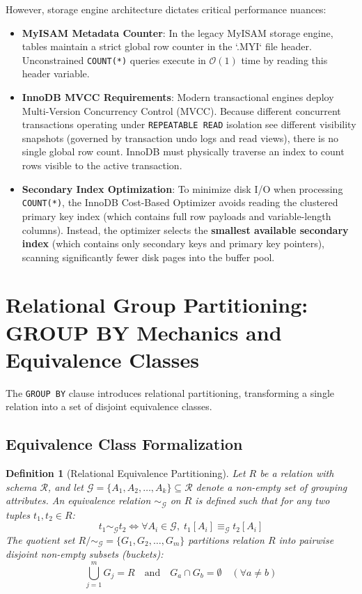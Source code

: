 \documentclass[10pt,twocolumn,letterpaper]{article}
\newtheorem{definition}[theorem]{Definition}
\begin{document}
However, storage engine architecture dictates critical performance nuances:
\begin{itemize}
    \item \textbf{MyISAM Metadata Counter}: In the legacy MyISAM storage engine, tables maintain a strict global row counter in the `.MYI` file header. Unconstrained \texttt{COUNT(*)} queries execute in $\mathcal{O}(1)$ time by reading this header variable.
    \item \textbf{InnoDB MVCC Requirements}: Modern transactional engines deploy Multi-Version Concurrency Control (MVCC). Because different concurrent transactions operating under \texttt{REPEATABLE READ} isolation see different visibility snapshots (governed by transaction undo logs and read views), there is no single global row count. InnoDB must physically traverse an index to count rows visible to the active transaction.
    \item \textbf{Secondary Index Optimization}: To minimize disk I/O when processing \texttt{COUNT(*)}, the InnoDB Cost-Based Optimizer avoids reading the clustered primary key index (which contains full row payloads and variable-length columns). Instead, the optimizer selects the \textbf{smallest available secondary index} (which contains only secondary keys and primary key pointers), scanning significantly fewer disk pages into the buffer pool.
\end{itemize}

\section{Relational Group Partitioning: GROUP BY Mechanics and Equivalence Classes}
\label{sec:group_by}

The \texttt{GROUP BY} clause introduces relational partitioning, transforming a single relation into a set of disjoint equivalence classes.

\subsection{Equivalence Class Formalization}
\begin{definition}[Relational Equivalence Partitioning]
Let $R$ be a relation with schema $\mathcal{R}$, and let $\mathcal{G} = \{A_1, A_2, \dots, A_k\} \subseteq \mathcal{R}$ denote a non-empty set of grouping attributes. An equivalence relation $\sim_{\mathcal{G}}$ on $R$ is defined such that for any two tuples $t_1, t_2 \in R$:
\begin{equation}
t_1 \sim_{\mathcal{G}} t_2 \iff \forall A_i \in \mathcal{G}, \; t_1[A_i] \equiv_{\mathcal{G}} t_2[A_i]
\end{equation}
The quotient set $R / \sim_{\mathcal{G}} = \{G_1, G_2, \dots, G_m\}$ partitions relation $R$ into pairwise disjoint non-empty subsets (buckets):
\begin{equation}
\bigcup_{j=1}^m G_j = R \quad \text{and} \quad G_a \cap G_b = \emptyset \quad (\forall a \neq b)
\end{equation}
\end{definition}
\end{document}
